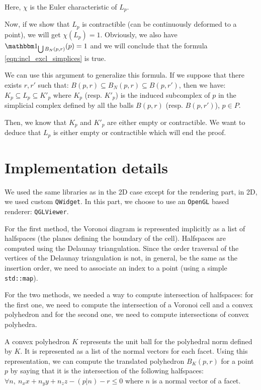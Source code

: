 Here, $ \chi $ is the Euler characteristic of $ L_p $.

Now, if we show that $ L_p $ is contractible (can be continuously deformed to a
point), we will get $ \chi(L_p) = 1 $. Obviously, we also have $
\indicator{\bigcup B_N(p, r)}(p) = 1 $ and we will conclude that the formula
\ref{eqn:incl_excl_simplices} is true.

We can use this argument to generalize this formula. If we suppose that there
exists $ r, r' $ such that: $ B(p, r) \subseteq B_N(p, r) \subseteq B(p, r') $,
then we have: $ K_p \subseteq L_p \subseteq K'_p $ where $ K_p $ (resp. $ K'_p $)
is the induced subcomplex of $ p $ in the simplicial complex defined by all the
balls $ B(p, r) $ (resp. $ B(p, r') $), $ p \in P $.

Then, we know that $ K_p $ and $ K'_p $ are either empty or contractible. We
want to deduce that $ L_p $ is either empty or contractible which will end the
proof.


\section{Implementation details}

We used the same libraries as in the 2D case except for the rendering part, in
2D, we used custom \texttt{QWidget}. In this part, we choose to use an
\texttt{OpenGL} based renderer: \texttt{QGLViewer}.

For the first method, the Voronoi diagram is represented implicitly as a list of
halfspaces (the planes defining the boundary of the cell). Halfspaces are
computed using the Delaunay triangulation. Since the order traversal of the vertices
of the Delaunay triangulation is not, in general, be the same as the insertion
order, we need to associate an index to a point (using a simple
\texttt{std::map}).

For the two methods, we needed a way to compute intersection of halfspaces: for
the first one, we need to compute the intersection of a Voronoi cell and a
convex polyhedron and for the second one, we need to compute intersections of
convex polyhedra.

A convex polyhedron $ K $ represents the unit ball for the polyhedral norm
defined by $ K $. It is represented as a list of the normal vectors for each
facet. Using this representation, we can compute the translated polyhedron $
B_K(p, r) $ for a point $ p $ by saying that it is the intersection of the
following halfspaces: $ \forall n,~ n_x x + n_y y + n_z z - (p | n) - r \leq 0 $
where $ n $ is a normal vector of a facet.

